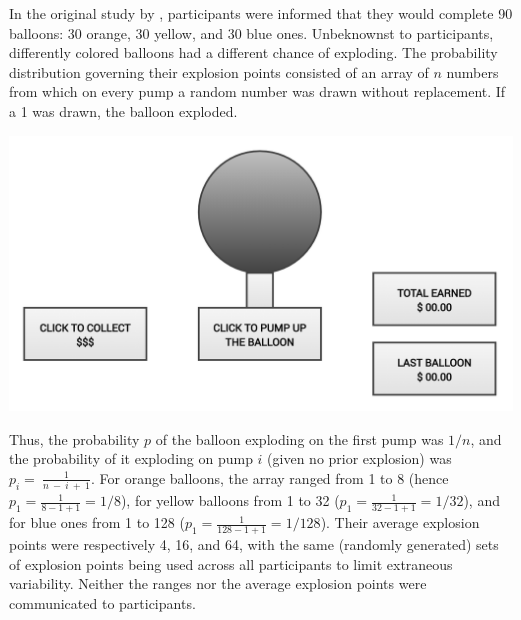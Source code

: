 \documentclass[serif, twocolumn, authordate, meta]{jote-article}
\begin{document}
In the original study by \textcite{Lejuez2002}, participants were informed that they would complete 90 balloons: 30 orange, 30 yellow, and 30 blue ones. Unbeknownst to participants, differently colored balloons had a different chance of exploding. The probability distribution governing their explosion points consisted of an array of \(n\) numbers from which on every pump a random number was drawn without replacement. If a 1 was drawn, the balloon exploded.

\noindent\begin{minipage}{.48\textwidth}
\includegraphics[width=\textwidth]{media/Anonymised Figure_1 - BART Problems (1).png}
\label{fig:figure1}
\end{minipage}

\vspace*{1\baselineskip}

Thus, the probability \(p\) of the balloon exploding on the first pump was \(1/n\), and the probability of it exploding on pump \(i\) (given no prior explosion) was \(p_{i} = \ \frac{1}{n\  - \ i\  + \ 1}\). For orange balloons, the array ranged from 1 to 8 (hence \(p_{1} = \frac{1}{8 - 1 + 1} = 1/8\)), for yellow balloons from 1 to 32 (\(p_{1} = \frac{1}{32 - 1 + 1} = 1/32\)), and for blue ones from 1 to 128 (\(p_{1} = \frac{1}{128 - 1 + 1} = 1/128\)). Their average explosion points were respectively 4, 16, and 64, with the same (randomly generated) sets of explosion points being used across all participants to limit extraneous variability. Neither the ranges nor the average explosion points were communicated to participants.
\end{document}
